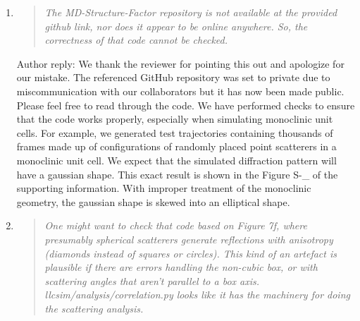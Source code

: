 \documentclass{article}
\begin{document}
\begin{enumerate}
    \item \begin{quote}
    \textit{The MD-Structure-Factor repository is not available at the provided
	    github link, nor does it appear to be online anywhere. So, the correctness of
	    that code cannot be checked.}
    \end{quote}
    
    Author reply: We thank the reviewer for pointing this out and apologize for
    our mistake. The referenced GitHub repository was set to private due to
    miscommunication with our collaborators but it has now been made public. Please
    feel free to read through the code. We have performed checks to ensure that the
    code works properly, especially when simulating monoclinic unit cells. For
    example, we generated test trajectories containing thousands of frames made up
    of configurations of randomly placed point scatterers in a monoclinic unit cell.
    We expect that the simulated diffraction pattern will have a gaussian shape.
    This exact result is shown in the Figure S-\_ of the supporting information.
    With improper treatment of the monoclinic geometry, the gaussian shape is
    skewed into an elliptical shape. 
    
    \item \begin{quote}
    \textit{One might want to check that code based on Figure 7f, where
	    presumably spherical scatterers generate reflections with anisotropy (diamonds
	    instead of squares or circles). This kind of an artefact is plausible if there
	    are errors handling the non-cubic box, or with scattering angles that aren't
	    parallel to a box axis. llcsim/analysis/correlation.py looks like it has the
	    machinery for doing the scattering analysis.}
    \end{quote}
	

\end{enumerate}
\end{document}
